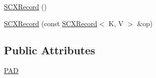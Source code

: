 \begin{DoxyCompactItemize}
\begin{tabbing}
\end{tabbing}\item 
\hyperlink{classbst__ns_1_1SCXRecord_a49f921666ea148854d5b3c7fcb060d7a}{S\+C\+X\+Record} ()
\item 
\hyperlink{classbst__ns_1_1SCXRecord_a0d59d4c65b6963f463029d761aaf414c}{S\+C\+X\+Record} (const \hyperlink{classbst__ns_1_1SCXRecord}{S\+C\+X\+Record}$<$ K, V $>$ \&op)
\end{DoxyCompactItemize}
\subsection*{Public Attributes}
\begin{DoxyCompactItemize}
\item 
\hyperlink{classbst__ns_1_1SCXRecord_aab91d9999057a9ca058de5947bfc0af1}{P\+AD}
\end{DoxyCompactItemize}
